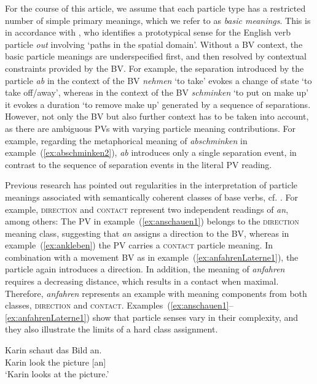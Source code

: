 \documentclass[output=paper]{langsci/langscibook}
\begin{document}
For the course of this article, we assume that each particle type has
a restricted number of simple primary meanings, which we refer to as
\textit{basic meanings}. This is in accordance with \cite{Lindner:83},
who identifies a prototypical sense for the English verb particle
\textit{out} involving `paths in the spatial domain'. Without a BV
context, the basic particle meanings are underspecified first, and
then resolved by contextual constraints provided by the BV. For
example, the separation introduced by the particle \textit{ab} in the
context of the BV \textit{nehmen} `to take' evokes a change of state
`to take off/away', whereas in the context of the BV
\textit{schminken} `to put on make up' it evokes a duration `to
remove make up' generated by a sequence of separations. However, not
only the BV but also further context has to be taken into account, as
there are ambiguous PVs with varying particle meaning
contributions. For example, regarding the metaphorical meaning of
\textit{abschminken} in example~(\ref{ex:abschminken2}), \textit{ab}
introduces only a single separation event, in contrast to the sequence
of separation events in the literal PV reading.

Previous research has pointed out regularities in the interpretation
of particle meanings associated with semantically coherent classes of
base verbs,
cf. \cite{Stiebels:96,Lechler/Rossdeutscher:09ALTER,Kliche:11ALTER,Springorum:11ALTER}.
For example, \textsc{direction} and \textsc{contact} represent two
independent readings of \textit{an}, among others: The PV in
example~(\ref{ex:anschauen1}) belongs to the \textsc{direction}
meaning class, suggesting that \textit{an} assigns a direction to the
BV, whereas in example~(\ref{ex:ankleben}) the PV carries a
\textsc{contact} particle meaning. In combination with a movement BV
as in example~(\ref{ex:anfahrenLaterne1}), the particle again
introduces a direction. In addition, the meaning of \textit{anfahren}
requires a decreasing distance, which results in a contact when
maximal. Therefore, \textit{anfahren} represents an example with
meaning components from both classes, \textsc{direction} and
\textsc{contact}. Examples~(\ref{ex:anschauen1}--\ref{ex:anfahrenLaterne1})
show that particle senses vary in their complexity, and they also
illustrate the limits of a hard class assignment.

\ea\label{ex:anschauen1}
\gll Karin schaut das Bild an.\\
Karin look the picture [an]\\
\glt `Karin looks at the picture.'
\z
\end{document}
